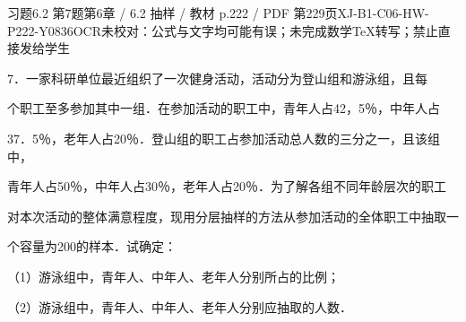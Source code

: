 \begin{bankitem}{习题6.2 第7题}{第6章 / 6.2 抽样 / 教材 p.222 / PDF 第229页}{XJ-B1-C06-HW-P222-Y0836}{OCR未校对：公式与文字均可能有误；未完成数学TeX转写；禁止直接发给学生}
\begin{ocrdraft}
\par
7．一家科研单位最近组织了一次健身活动，活动分为登山组和游泳组，且每
\par
个职工至多参加其中一组．在参加活动的职工中，青年人占42，5％，中年人占
\par
37．5％，老年人占20％．登山组的职工占参加活动总人数的三分之一，且该组中，
\par
青年人占50％，中年人占30％，老年人占20％．为了解各组不同年龄层次的职工
\par
对本次活动的整体满意程度，现用分层抽样的方法从参加活动的全体职工中抽取一
\par
个容量为200的样本．试确定：
\par
（1）游泳组中，青年人、中年人、老年人分别所占的比例；
\par
（2）游泳组中，青年人、中年人、老年人分别应抽取的人数．
\end{ocrdraft}
\end{bankitem}
